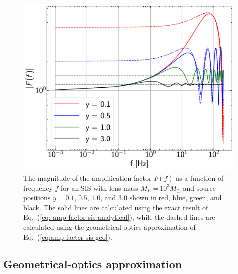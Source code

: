 \documentclass[floats,floatfix,showpacs,amssymb,prd,twocolumn,superscriptaddress,nofootinbib,nolongbibliography,reprint]{revtex4-2}
\begin{document}
\begin{figure}[t!]
    \centering
    \includegraphics[scale = 0.33]{Figures/sis_amp_fact.pdf}
    \caption{The magnitude of the amplification factor $F(f)$ as a function of frequency $f$ for an SIS with lens mass $M_L = 10^3 M_\odot$ and source positions $y = 0.1$, $0.5$, $1.0$, and $3.0$ shown in red, blue, green, and black. The solid lines are calculated using the exact result of Eq.~(\ref{eq: amp factor sis analytical}), while the dashed lines are calculated using the geometrical-optics approximation of Eq.~(\ref{eq:amp factor sis geo}).
    }
    \label{fig:amplification factor sis}
\end{figure}


\subsection{\label{subsubsec:geometrical optics approximation} Geometrical-optics approximation}
\end{document}
